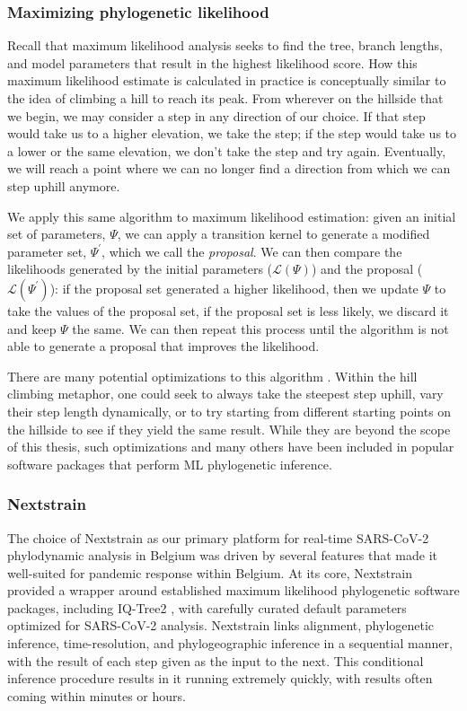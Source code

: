 \subsubsection{Maximizing phylogenetic likelihood}
Recall that maximum likelihood analysis seeks to find the tree, branch lengths, and model parameters that result in the highest likelihood score.
How this maximum likelihood estimate is calculated in practice is conceptually similar to the idea of climbing a hill to reach its peak.
From wherever on the hillside that we begin, we may consider a step in any direction of our choice.
If that step would take us to a higher elevation, we take the step; if the step would take us to a lower or the same elevation, we don't take the step and try again.
Eventually, we will reach a point where we can no longer find a direction from which we can step uphill anymore.

We apply this same algorithm to maximum likelihood estimation: given an initial set of parameters, $\Psi$, we can apply a transition kernel to generate a modified parameter set, $\Psi^{\prime}$, which we call the \textit{proposal}.
We can then compare the likelihoods generated by the initial parameters ($\mathcal{L}(\Psi)$) and the proposal ($\mathcal{L}(\Psi^{\prime})$): if the proposal set generated a higher likelihood, then we update $\Psi$ to take the values of the proposal set, if the proposal set is less likely, we discard it and keep $\Psi$ the same.
We can then repeat this process until the algorithm is not able to generate a proposal that improves the likelihood.

There are many potential optimizations to this algorithm \citep{chinnasamy2022review}.
Within the hill climbing metaphor, one could seek to always take the steepest step uphill, vary their step length dynamically, or to try starting from different starting points on the hillside to see if they yield the same result.
While they are beyond the scope of this thesis, such optimizations and many others have been included in popular software packages that perform ML phylogenetic inference.

\subsubsection{Nextstrain}
The choice of Nextstrain \citep{hadfield2018nextstrain} as our primary platform for real-time SARS-CoV-2 phylodynamic analysis in Belgium was driven by several features that made it well-suited for pandemic response within Belgium.
At its core, Nextstrain provided a wrapper around established maximum likelihood phylogenetic software packages, including IQ-Tree2 \citep{minh2020iq}, with carefully curated default parameters optimized for SARS-CoV-2 analysis.
Nextstrain links alignment, phylogenetic inference, time-resolution, and phylogeographic inference in a sequential manner, with the result of each step given as the input to the next.
This conditional inference procedure results in it running extremely quickly, with results often coming within minutes or hours.

